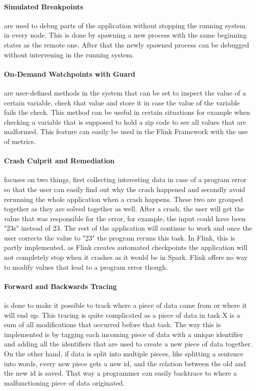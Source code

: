 \paragraph{Simulated Breakpoints} are used to debug parts of the application without stopping the running system in every node. This is done by spawning a new process with the same beginning states as the remote one. After that the newly spawned process can be debugged without intervening in the running system.

\paragraph{On-Demand Watchpoints with Guard} are user-defined methods in the system that can be set to inspect the value of a certain variable, check that value and store it in case the value of the variable fails the check. This method can be useful in certain situations for example when checking a variable that is supposed to hold a zip code to see all values that are malformed. This feature can easily be used in the Flink Framework with the use of metrics.

\paragraph{Crash Culprit and Remediation} focuses on two things, first collecting interesting data in case of a program error so that the user can easily find out why the crash happened and secondly avoid rerunning the whole application when a crash happens. These two are grouped together as they are solved together as well. After a crash, the user will get the value that was responsible for the error, for example, the input could have been "23s" instead of 23. The rest of the application will continue to work and once the user corrects the value to "23" the program reruns this task. In Flink, this is partly implemented, as Flink creates automated checkpoints the application will not completely stop when it crashes as it would be in Spark. Flink offers no way to modify values that lead to a program error though.

\paragraph{Forward and Backwards Tracing} is done to make it possible to track where a piece of data came from or where it will end up. This tracing is quite complicated as a piece of data in task X is a sum of all modifications that occurred before that task. The way this is implemented is by tagging each incoming piece of data with a unique identifier and adding all the identifiers that are used to create a new piece of data together. On the other hand, if data is split into multiple pieces, like splitting a sentence into words, every new piece gets a new id, and the relation between the old and the new id is saved. That way a programmer can easily backtrace to where a malfunctioning piece of data originated.

